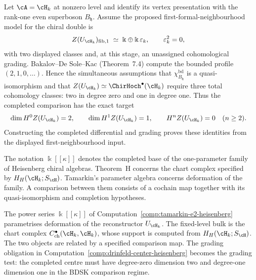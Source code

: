 \begin{computation}
\label{comp:drinfeld-center-heisenberg}
Let $\cA=\cH_k$ at nonzero level and identify its vertex presentation
with the rank-one even superboson $B_{\mathfrak h}$. Assume the
proposed first-formal-neighbourhood model for the chiral double is
\begin{equation}
Z(U_{\cH_k})_{\mathrm{fib},1} \;\simeq\;
\Bbbk\oplus \Bbbk\,\varepsilon_k,\qquad \varepsilon_k^2=0,
\end{equation}
with two displayed classes and, at this stage, an unassigned
cohomological grading. Bakalov--De Sole--Kac
\cite{BDSK21} \textup{(}Theorem~7.4\textup{)} compute the bounded profile
$(2,1,0,\ldots)$. Hence the simultaneous assumptions
that $\chi^{\mathrm{bd}}_{B_{\mathfrak h}}$ is a quasi-isomorphism and
that $Z(U_{\cH_k})\simeq\ChirHoch^\bullet(\cH_k)$ require three total
cohomology classes: two in degree zero and one in degree one. Thus the
completed comparison has the exact target
\[
 \dim H^0 Z(U_{\cH_k})=2,
 \qquad
 \dim H^1 Z(U_{\cH_k})=1,
 \qquad
 H^n Z(U_{\cH_k})=0\quad(n\ge2).
\]
Constructing the completed differential and grading proves these
identities from the displayed first-neighbourhood input.
\end{computation}

\begin{remark}
\label{rem:drinfeld-center-heisenberg-tamarkin-inconsistency}
The notation $\Bbbk[[\kappa]]$ denotes the completed base of the
one-parameter family of Heisenberg chiral algebras.  Theorem~H concerns
the chart complex specified by $H_H(\cH_k;S_{\cH})$.  Tamarkin's
parameter algebra concerns deformation of the family.  A comparison
between them consists of a cochain map together with its
quasi-isomorphism and completion hypotheses.
\end{remark}

\begin{remark}
\label{rem:drinfeld-center-heisenberg-thesis-resolution}
The power series $\Bbbk[[\kappa]]$ of
Computation~\ref{comp:tamarkin-e2-heisenberg} parametrises deformation
of the reconstructor $U_{\cH_k}$.  The fixed-level bulk is the chart
complex $C^\bullet_{\mathrm{ch}}(\cH_k,\cH_k)$, whose support is
computed from $H_H(\cH_k;S_{\cH})$.  The two objects are related by a
specified comparison map. The grading obligation in
Computation~\ref{comp:drinfeld-center-heisenberg} becomes the grading
test: the completed centre must have degree-zero dimension two and
degree-one dimension one in the BDSK comparison regime.
\end{remark}

